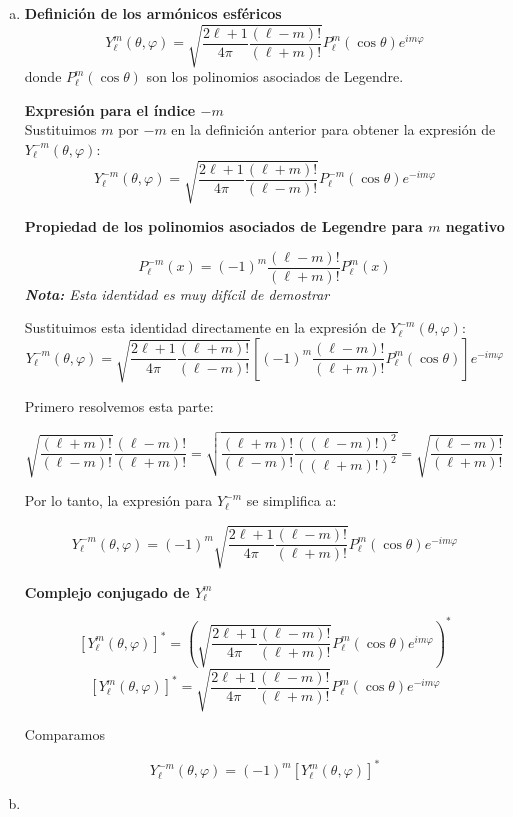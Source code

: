 \documentclass[a4paper]{article}
\begin{document}
\begin{enumerate}[a)]
	\item 
\textbf{Definición de los armónicos esféricos} 
$$
Y_\ell^m(\theta, \varphi) = \sqrt{\frac{2\ell+1}{4\pi} \frac{(\ell-m)!}{(\ell+m)!}} P_\ell^m(\cos\theta) e^{im\varphi}
$$
donde $P_\ell^m(\cos\theta)$ son los polinomios asociados de Legendre.

\textbf{Expresión para el índice $-m$} \\
Sustituimos $m$ por $-m$ en la definición anterior para obtener la expresión de $Y_\ell^{-m}(\theta, \varphi)$:
$$
Y_\ell^{-m}(\theta, \varphi) = \sqrt{\frac{2\ell+1}{4\pi} \frac{(\ell+m)!}{(\ell-m)!}} P_\ell^{-m}(\cos\theta) e^{-im\varphi}
$$

\textbf{Propiedad de los polinomios asociados de Legendre para $m$ negativo} 

$$
P_\ell^{-m}(x) = (-1)^m \frac{(\ell-m)!}{(\ell+m)!} P_\ell^m(x)
$$
\textit{\textbf{Nota:} Esta identidad es muy difícil de demostrar}


Sustituimos esta identidad directamente en la expresión de $Y_\ell^{-m}(\theta, \varphi)$:
$$
Y_\ell^{-m}(\theta, \varphi) = \sqrt{\frac{2\ell+1}{4\pi} \frac{(\ell+m)!}{(\ell-m)!}} \left[ (-1)^m \frac{(\ell-m)!}{(\ell+m)!} P_\ell^m(\cos\theta) \right] e^{-im\varphi}
$$

Primero resolvemos esta parte:

$$
\sqrt{\frac{(\ell+m)!}{(\ell-m)!}} \frac{(\ell-m)!}{(\ell+m)!} = \sqrt{\frac{(\ell+m)!}{(\ell-m)!} \frac{((\ell-m)!)^2}{((\ell+m)!)^2}} = \sqrt{\frac{(\ell-m)!}{(\ell+m)!}}
$$

Por lo tanto, la expresión para $Y_\ell^{-m}$ se simplifica a:

$$
Y_\ell^{-m}(\theta, \varphi) = (-1)^m \sqrt{\frac{2\ell+1}{4\pi} \frac{(\ell-m)!}{(\ell+m)!}} P_\ell^m(\cos\theta) e^{-im\varphi}
$$

\textbf{Complejo conjugado de $Y_\ell^m$}


$$
\left[Y_\ell^m(\theta, \varphi)\right]^* = \left( \sqrt{\frac{2\ell+1}{4\pi} \frac{(\ell-m)!}{(\ell+m)!}} P_\ell^m(\cos\theta) e^{im\varphi} \right)^*
$$
$$
\left[Y_\ell^m(\theta, \varphi)\right]^* = \sqrt{\frac{2\ell+1}{4\pi} \frac{(\ell-m)!}{(\ell+m)!}} P_\ell^m(\cos\theta) e^{-im\varphi}
$$

Comparamos

$$
Y_\ell^{-m}(\theta, \varphi) = (-1)^m \left[Y_\ell^m(\theta, \varphi)\right]^*
$$

\item 


\end{enumerate}
\end{document}
